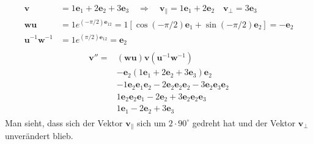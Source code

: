 \begin{beispiel} 
	\begin{align}
		\begin{split}
			\mathbf{v} &= 1\mathbf{e}_1 + 2\mathbf{e}_2 + 3\mathbf{e}_3\quad\Rightarrow\quad \mathbf{v_\parallel} = 1\mathbf{e}_1 + 2\mathbf{e}_2 \quad \mathbf{v_\perp} = 3\mathbf{e}_3\\ 
			\mathbf{wu} &= 1e^{(-\pi/2) \mathbf{e}_{12}} = 1[\cos(-\pi/2)\mathbf{e}_1+\sin(-\pi/2)\mathbf{e}_2] = -\mathbf{e}_2 \\
			\mathbf{u}^{-1}\mathbf{w}^{-1} &= 1e^{(\pi/2) \mathbf{e}_{12}} = \mathbf{e}_2
		\end{split}
	\end{align}
	\begin{align}
		\begin{split}
			\mathbf{v}'' = &(\mathbf{wu})\mathbf{v}(\mathbf{u}^{-1}\mathbf{w}^{-1}) \\ 
			&-\mathbf{e}_2 (1\mathbf{e}_1 + 2\mathbf{e}_2 + 3\mathbf{e}_3) \mathbf{e}_2 \\
			& -1\mathbf{e}_2\mathbf{e}_1\mathbf{e}_2 - 2\mathbf{e}_2\mathbf{e}_2\mathbf{e}_2 - 3\mathbf{e}_2\mathbf{e}_3\mathbf{e}_2 \\
			& 1\mathbf{e}_2\mathbf{e}_2\mathbf{e}_1 - 2\mathbf{e}_2 + 3\mathbf{e}_2\mathbf{e}_2\mathbf{e}_3 \\
			& 1\mathbf{e}_1 - 2\mathbf{e}_2 + 3\mathbf{e}_3
		\end{split}
	\end{align}
	Man sieht, dass sich der Vektor $\mathbf{v_\parallel}$ sich um $2\cdot90^\circ$ gedreht hat und der Vektor $\mathbf{v_\perp}$ unverändert blieb.
\end{beispiel}